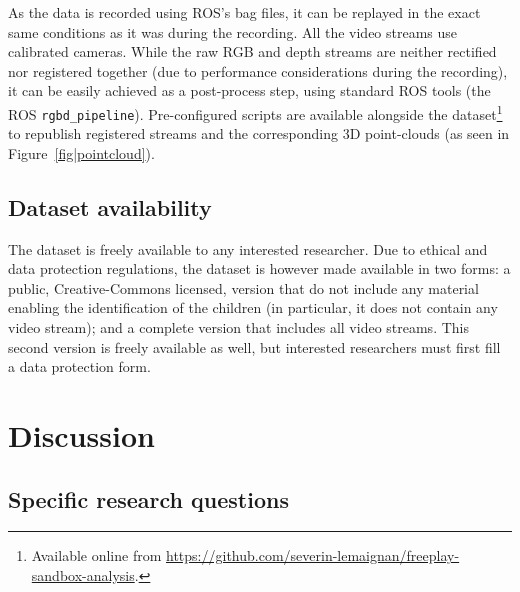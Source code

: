 \documentclass{article}
\begin{document}
As the data is recorded using ROS's bag files, it can be replayed in the exact
same conditions as it was during the recording. All the video streams use
calibrated cameras. While the raw RGB and depth streams are neither rectified
nor registered together (due to performance considerations during the
recording), it can be easily achieved as a post-process step, using standard ROS
tools (the ROS {\tt rgbd\_pipeline}). Pre-configured scripts are available
alongside the
dataset\footnote{Available online from
\url{https://github.com/severin-lemaignan/freeplay-sandbox-analysis}.} to
republish registered streams and the corresponding 3D point-clouds (as seen in
Figure~\ref{fig|pointcloud}).

\subsection{Dataset availability}
\label{availability}


The dataset is freely available to any interested researcher. Due to ethical
and data protection regulations, the dataset is however made available in two
forms: a public, Creative-Commons licensed, version that do not include any
material enabling the identification of the children (in particular, it does not
contain any video stream); and a complete version that includes all video
streams. This second version is freely available as well, but interested
researchers must first fill a data protection form.


\section{Discussion}

\subsection{Specific research questions}
\end{document}
